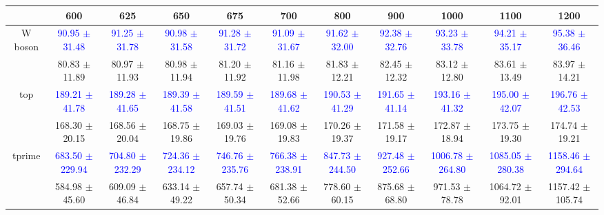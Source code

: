 {
\renewcommand{\arraystretch}{1.0}
\begin{center}
\begin{small}
\begin{tabular}{ccccccccccc}
\hline\hline
 & 600 & 625 & 650 & 675 & 700 & 800 & 900 & 1000 & 1100 & 1200 \\
\hline
\multirow{2}{*}{W boson} & \textcolor{blue}{90.95 $\pm$ 31.48} & \textcolor{blue}{91.25 $\pm$ 31.78} & \textcolor{blue}{90.98 $\pm$ 31.58} & \textcolor{blue}{91.28 $\pm$ 31.72} & \textcolor{blue}{91.09 $\pm$ 31.67} & \textcolor{blue}{91.62 $\pm$ 32.00} & \textcolor{blue}{92.38 $\pm$ 32.76} & \textcolor{blue}{93.23 $\pm$ 33.78} & \textcolor{blue}{94.21 $\pm$ 35.17} & \textcolor{blue}{95.38 $\pm$ 36.46} \\
 & \textcolor{myred}{80.83 $\pm$ 11.89} & \textcolor{myred}{80.97 $\pm$ 11.93} & \textcolor{myred}{80.98 $\pm$ 11.94} & \textcolor{myred}{81.20 $\pm$ 11.92} & \textcolor{myred}{81.16 $\pm$ 11.98} & \textcolor{myred}{81.83 $\pm$ 12.21} & \textcolor{myred}{82.45 $\pm$ 12.32} & \textcolor{myred}{83.12 $\pm$ 12.80} & \textcolor{myred}{83.61 $\pm$ 13.49} & \textcolor{myred}{83.97 $\pm$ 14.21} \\
\hline
\multirow{2}{*}{top} & \textcolor{blue}{189.21 $\pm$ 41.78} & \textcolor{blue}{189.28 $\pm$ 41.65} & \textcolor{blue}{189.39 $\pm$ 41.58} & \textcolor{blue}{189.59 $\pm$ 41.51} & \textcolor{blue}{189.68 $\pm$ 41.62} & \textcolor{blue}{190.53 $\pm$ 41.29} & \textcolor{blue}{191.65 $\pm$ 41.14} & \textcolor{blue}{193.16 $\pm$ 41.32} & \textcolor{blue}{195.00 $\pm$ 42.07} & \textcolor{blue}{196.76 $\pm$ 42.53} \\
 & \textcolor{myred}{168.30 $\pm$ 20.15} & \textcolor{myred}{168.56 $\pm$ 20.04} & \textcolor{myred}{168.75 $\pm$ 19.86} & \textcolor{myred}{169.03 $\pm$ 19.76} & \textcolor{myred}{169.08 $\pm$ 19.83} & \textcolor{myred}{170.26 $\pm$ 19.37} & \textcolor{myred}{171.58 $\pm$ 19.17} & \textcolor{myred}{172.87 $\pm$ 18.94} & \textcolor{myred}{173.75 $\pm$ 19.30} & \textcolor{myred}{174.74 $\pm$ 19.21} \\
\hline
\multirow{2}{*}{tprime} & \textcolor{blue}{683.50 $\pm$ 229.94} & \textcolor{blue}{704.80 $\pm$ 232.29} & \textcolor{blue}{724.36 $\pm$ 234.12} & \textcolor{blue}{746.76 $\pm$ 235.76} & \textcolor{blue}{766.38 $\pm$ 238.91} & \textcolor{blue}{847.73 $\pm$ 244.50} & \textcolor{blue}{927.48 $\pm$ 252.66} & \textcolor{blue}{1006.78 $\pm$ 264.80} & \textcolor{blue}{1085.05 $\pm$ 280.38} & \textcolor{blue}{1158.46 $\pm$ 294.64} \\
 & \textcolor{myred}{584.98 $\pm$ 45.60} & \textcolor{myred}{609.09 $\pm$ 46.84} & \textcolor{myred}{633.14 $\pm$ 49.22} & \textcolor{myred}{657.74 $\pm$ 50.34} & \textcolor{myred}{681.38 $\pm$ 52.66} & \textcolor{myred}{778.60 $\pm$ 60.15} & \textcolor{myred}{875.68 $\pm$ 68.80} & \textcolor{myred}{971.53 $\pm$ 78.78} & \textcolor{myred}{1064.72 $\pm$ 92.01} & \textcolor{myred}{1157.42 $\pm$ 105.74} \\
\hline\hline
\end{tabular}
\end{small}
\end{center}
}

